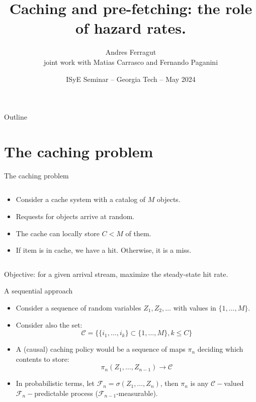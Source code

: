 \documentclass[aspectratio=169]{beamer}
\title{Caching and pre-fetching: the role of hazard rates.}
\author[Andres Ferragut, Universidad ORT Uruguay]{Andres Ferragut\\[.6em] \normalsize joint work with Matias Carrasco and Fernando Paganini}
\institute{Universidad ORT Uruguay}
\date[GATECH 2024]{ISyE Seminar -- Georgia Tech -- May 2024}
\newenvironment*{myitem}[1][1.5em]{\begin{itemize}\setlength{\itemsep}{#1}}{\end{itemize}}
\begin{document}
\frame[plain]{\titlepage}

\begin{frame}{Outline}
\tableofcontents
\end{frame}

\section{The caching problem}

\begin{frame}{The caching problem}
	
	\begin{columns}
		\begin{column}{0.61\textwidth}
			\begin{myitem}[2em]
				\item Consider a \alert{cache system} with a catalog of $M$ objects.
				\item Requests for objects arrive at random.
				\item The cache can locally store $C<M$ of them.
				\item If item is in cache, we have a \alert{hit}. Otherwise, it is a \alert{miss}.
			\end{myitem}
		\end{column}
		\begin{column}{0.39\textwidth}
			\centering
			
		\end{column}
	\end{columns}

	\vfill

	\centering
	\alert{Objective:} for a given arrival stream, maximize the steady-state \alert{hit rate}.
\end{frame}

\begin{frame}{A sequential approach}

  \begin{myitem}
  \item Consider a sequence of random variables $Z_1,Z_2,\ldots$ with values in $\{1,\ldots,M\}$.
    
  \item Consider also the set:
   \begin{equation*}
    \mathcal{C} = \{\{i_1,\ldots,i_k\}\subset \{1,\ldots,M\}, k\leqslant C\} 
   \end{equation*}

  \item A (causal) caching policy would be a sequence of maps $\pi_n$ deciding which contents to store:
    \begin{equation*}
      \pi_n(Z_1,\ldots,Z_{n-1}) \to \mathcal{C}
    \end{equation*}

  \item In probabilistic terms, let $\mathcal{F}_n = \sigma(Z_1,\ldots,Z_n)$, then $\pi_n$ is any $\mathcal{C}-$valued $\mathcal{F}_n-$predictable process ($\mathcal{F}_{n-1}$-measurable).
  \end{myitem}


\end{frame}
\end{document}
